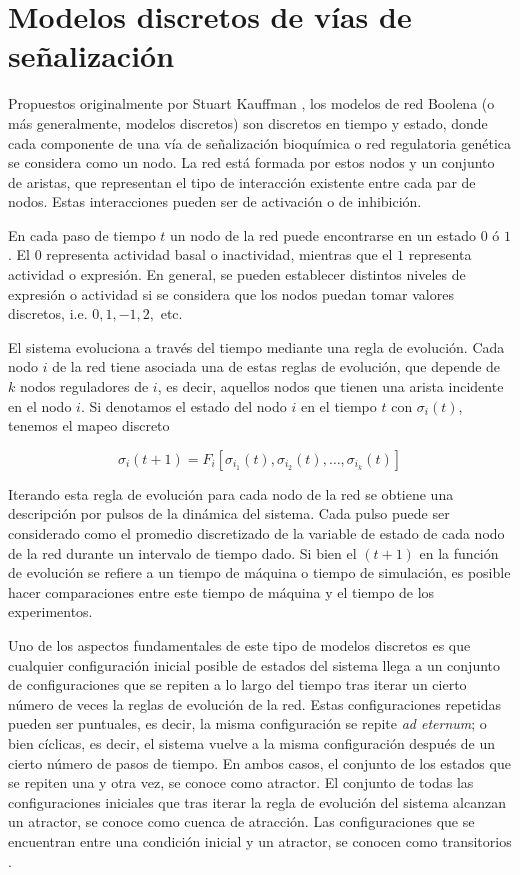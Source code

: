 \section{Modelos discretos de vías de señalización}

Propuestos originalmente por Stuart Kauffman \citeauthor{Kauffman:1969up} \citep{Kauffman:1969up}, los modelos de red Boolena (o más generalmente, modelos discretos) son discretos en tiempo y estado, donde cada componente de una vía de señalización  bioquímica o red regulatoria genética se considera como un nodo. La red está formada por estos nodos y un conjunto de aristas, que representan el tipo de interacción existente entre cada par de nodos. Estas interacciones pueden ser de activación o de inhibición. 

En cada paso de tiempo $t$ un nodo de la red puede encontrarse en un estado $0$ ó $1$. El $0$ representa actividad basal o inactividad, mientras que el $1$ representa actividad o expresión. En general, se pueden establecer distintos niveles de expresión o actividad si se considera que los nodos puedan tomar valores discretos, i.e. $0, 1, -1, 2,$ etc.

El sistema evoluciona a través del tiempo mediante una regla de evolución. Cada nodo $i$ de la red tiene asociada una de estas reglas de evolución,  que depende de $k$ nodos reguladores de $i$, es decir, aquellos nodos que tienen una arista incidente en el nodo $i$. Si denotamos el estado del nodo $i$ en el tiempo $t$ con $\sigma_i(t)$, tenemos el mapeo discreto

\begin{equation}\label{eqn:kaufman}
\sigma_i(t+1) = F_i[\sigma_{i_1}(t), \sigma_{i_2}(t),\ldots, \sigma_{i_k}(t)]
\end{equation}

Iterando esta regla de evolución para cada nodo de la red se obtiene una descripción por pulsos de la dinámica del sistema. Cada pulso puede ser considerado como el promedio discretizado de la variable de estado de cada nodo de la red durante un intervalo de tiempo dado. Si bien el $(t+1)$ en la función de evolución se refiere a un tiempo de máquina o tiempo de simulación, es posible hacer comparaciones entre este tiempo de máquina y el tiempo de los experimentos.

Uno de los aspectos fundamentales de este tipo de modelos discretos es que cualquier configuración inicial posible de estados del sistema llega a un conjunto de configuraciones que se repiten a lo largo del tiempo tras iterar un cierto número de veces la reglas de evolución de la red. Estas configuraciones repetidas pueden ser puntuales, es decir, la misma configuración se repite \emph{ad eternum}; o bien cíclicas, es decir, el sistema vuelve a la misma configuración después de un cierto número de pasos de tiempo. En ambos casos, el conjunto de los estados que se repiten una y otra vez, se conoce como atractor. El conjunto de todas las configuraciones iniciales que tras iterar la regla de evolución del sistema alcanzan un atractor, se conoce como cuenca de atracción. Las configuraciones que se encuentran entre una condición inicial y un atractor, se conocen como transitorios \citeauthor{Bornholdt:2005hg} \citep{Bornholdt:2005hg}.


